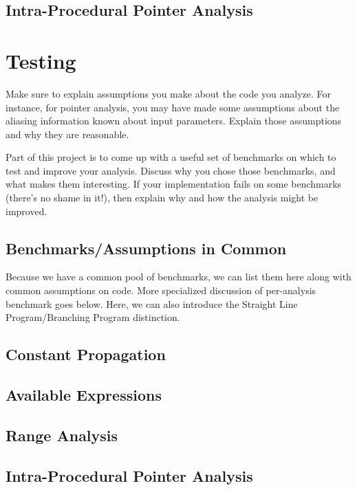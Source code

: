 \documentclass{article}
\theoremstyle{definition}
\begin{document}
\subsection{Intra-Procedural Pointer Analysis}



\section{Testing}
\begin{framed}
  Make sure to explain assumptions you make about the code you
  analyze. For instance, for pointer analysis, you may have made some
  assumptions about the aliasing information known about input
  parameters. Explain those assumptions and why they are reasonable.

  Part of this project is to come up with a useful set of benchmarks
  on which to test and improve your analysis. Discuss why you chose
  those benchmarks, and what makes them interesting. If your
  implementation fails on some benchmarks (there's no shame in it!),
  then explain why and how the analysis might be improved.
\end{framed}
\subsection{Benchmarks/Assumptions in Common}
Because we have a common pool of benchmarks, we can list them here
along with common assumptions on code. More specialized discussion of
per-analysis benchmark goes below. Here, we can also introduce the
Straight Line Program/Branching Program distinction.

\subsection{Constant Propagation}
\subsection{Available Expressions}
\subsection{Range Analysis}
\subsection{Intra-Procedural Pointer Analysis}
\end{document}
